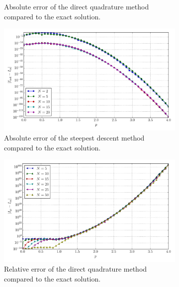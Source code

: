 \documentclass[a4paper,10pt]{article}
\begin{document}
\begin{figure}[ht!]
\begin{subfigure}[t]{0.5\linewidth}
    \caption{Absolute error of the direct quadrature method compared to the exact solution.}
    \label{fig:tp_2d_conv_p_88_88_err_qr}
  \end{subfigure}
  \begin{subfigure}[t]{0.5\linewidth}
    \includegraphics[width=\linewidth]{./plots/tp_2d_conv_p_(8,8)_(8,8)_err_nsd.pdf}
    \caption{Absolute error of the steepest descent method compared to the exact solution.}
    \label{fig:tp_2d_conv_p_88_88_err_nsd}
  \end{subfigure}
  \begin{subfigure}[t]{0.5\linewidth}
    \includegraphics[width=\linewidth]{./plots/tp_2d_conv_p_(8,8)_(8,8)_err_rel_qr.pdf}
    \caption{Relative error of the direct quadrature method compared to the exact solution.}
    \label{fig:tp_2d_conv_p_88_88_err_rel_qr}
  \end{subfigure}
  \begin{subfigure}[t]{0.5\linewidth}

\end{subfigure}
\end{figure}
\end{document}
